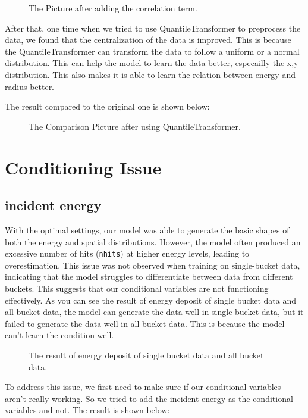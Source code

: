 \begin{figure}[h!]
    \centering
    \caption{The Picture after adding the correlation term.}
\end{figure}

After that, one time when we tried to use QuantileTransformer to preprocess the data, we found that the centralization of the data is improved. This is because the QuantileTransformer can transform the data to follow a uniform or a normal distribution. This can help the model to learn the data better, especailly the x,y distribution. This also makes it is able to learn the relation between energy and radius better.

The result compared to the original one is shown below:

\begin{figure}[h!]
    \centering
    \caption{The Comparison Picture after using QuantileTransformer.}
\end{figure}

\section{Conditioning Issue}
\subsection{incident energy}
With the optimal settings, our model was able to generate the basic shapes of both the energy and spatial distributions. However, the model often produced an excessive number of hits (\texttt{nhits}) at higher energy levels, leading to overestimation. This issue was not observed when training on single-bucket data, indicating that the model struggles to differentiate between data from different buckets. This suggests that our conditional variables are not functioning effectively. As you can see the result of energy deposit of single bucket data and all bucket data, the model can generate the data well in single bucket data, but it failed to generate the data well in all bucket data. This is because the model can't learn the condition well.

\begin{figure}[ht]
    \centering
    \caption{The result of energy deposit of single bucket data and all bucket data.}
\end{figure}

To address this issue, we first need to make sure if our conditional variables aren't really working. So we tried to add the incident energy as the conditional variables and not. The result is shown below:

